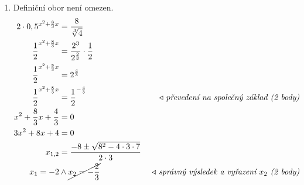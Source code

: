 \begin{center}
\begin{enumerate}
    \item Definiční obor není omezen.
    \begin{align*}
      \begin{aligned}
        2\cdot0,5^{x^2+\frac{8}{3}x}&=\frac{8}{\sqrt[3]{4}}\\
        \frac{1}{2}^{x^2+\frac{8}{3}x}&=\frac{2^3}{2^{\frac{2}{3}}}\cdot\frac{1}{2}\\
        \frac{1}{2}^{x^2+\frac{8}{3}x}&=2^{\frac{4}{3}}\\
        \frac{1}{2}^{x^2+\frac{8}{3}x}&=\frac{1}{2}^{-\frac{4}{3}}& \text{\rightnote{převedení na společný základ (2 body)}}\\
        x^2+\frac{8}{3}x +\frac{4}{3} &= 0\\
        3x^2+8x +4 &= 0\\
        x_{1,2}&=\frac{-8\pm\sqrt{8^2-4\cdot 3\cdot7}}{2\cdot 3} & \\
        x_1=-2 &\land \cancel{x_2=-\frac{2}{3}} & \text{\rightnote{správný výsledek a vyřazení $x_2$ (2 body)}}
      \end{aligned}
    \end{align*}
\end{enumerate}
\end{center}
